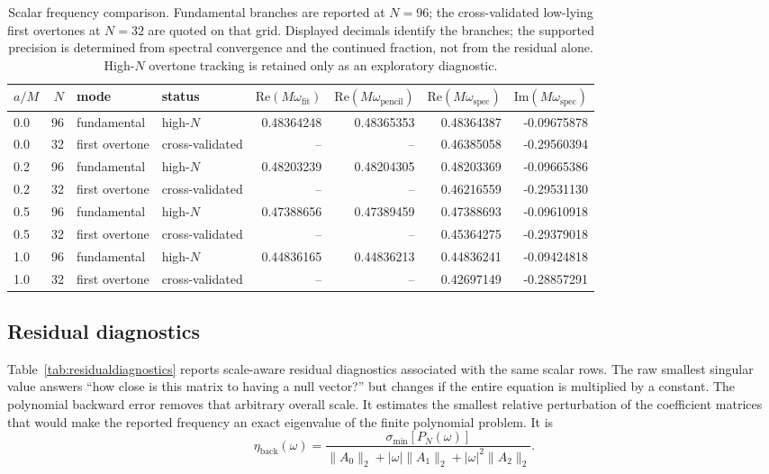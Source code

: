 \documentclass[12pt,a4paper]{article}
\begin{document}
\begin{table}[H]
\centering
\footnotesize
\renewcommand{\arraystretch}{1.16}
\color{blue}
\begin{tabular}{lrllrrrr}
\toprule
\(a/M\) & \(N\) & mode & status &
\(\mathrm{Re}(M\omega_{\mathrm{fit}})\) &
\(\mathrm{Re}(M\omega_{\mathrm{pencil}})\) &
\(\mathrm{Re}(M\omega_{\mathrm{spec}})\) &
\(\mathrm{Im}(M\omega_{\mathrm{spec}})\)\\
\midrule
0.0 & 96 & fundamental & high-\(N\) & 0.48364248 & 0.48365353 & 0.48364387 & -0.09675878\\
0.0 & 32 & first overtone & cross-validated & -- & -- & 0.46385058 & -0.29560394\\
0.2 & 96 & fundamental & high-\(N\) & 0.48203239 & 0.48204305 & 0.48203369 & -0.09665386\\
0.2 & 32 & first overtone & cross-validated & -- & -- & 0.46216559 & -0.29531130\\
0.5 & 96 & fundamental & high-\(N\) & 0.47388656 & 0.47389459 & 0.47388693 & -0.09610918\\
0.5 & 32 & first overtone & cross-validated & -- & -- & 0.45364275 & -0.29379018\\
1.0 & 96 & fundamental & high-\(N\) & 0.44836165 & 0.44836213 & 0.44836241 & -0.09424818\\
1.0 & 32 & first overtone & cross-validated & -- & -- & 0.42697149 & -0.28857291\\
\bottomrule
\end{tabular}
\caption{Scalar frequency comparison. Fundamental branches are reported at
\(N=96\); the cross-validated low-lying first overtones at \(N=32\) are quoted
on that grid. Displayed decimals identify the branches; the supported precision
is determined from spectral convergence and the continued fraction, not from
the residual alone. High-\(N\) overtone tracking is retained only as an
exploratory diagnostic.}
\color{black}
\label{tab:spectralresults}
\end{table}

\subsection{Residual diagnostics}

\color{blue}
Table~\ref{tab:residualdiagnostics} reports scale-aware residual diagnostics
associated with the same scalar rows.  The raw smallest singular value answers
``how close is this matrix to having a null vector?'' but changes if the entire
equation is multiplied by a constant.  The polynomial backward error removes
that arbitrary overall scale.  It estimates the smallest relative perturbation
of the coefficient matrices that would make the reported frequency an exact
eigenvalue of the finite polynomial problem.  It is
\begin{equation}
\eta_{\mathrm{back}}(\omega)=
\frac{\sigma_{\min}[P_N(\omega)]}
{\lVert A_0\rVert_2+|\omega|\lVert A_1\rVert_2+|\omega|^2\lVert A_2\rVert_2}.
\label{eq:backwarderror}
\end{equation}
\color{black}
\end{document}
